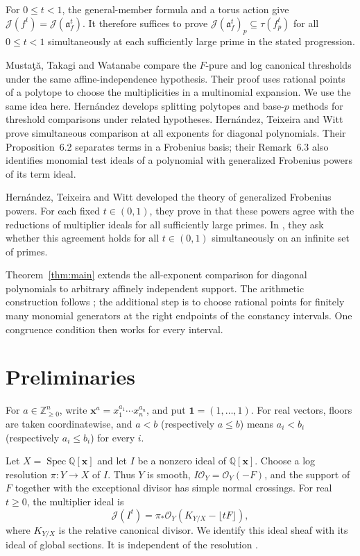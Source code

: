 \documentclass[11pt]{amsart}
\numberwithin{equation}{section}
\theoremstyle{definition}
\newcommand{\J}{\mathcal J}
\newcommand{\OO}{\mathcal O}
\newcommand{\aideal}{\mathfrak a}
\newcommand{\Q}{\mathbb Q}
\newcommand{\Z}{\mathbb Z}
\newcommand{\xx}{\boldsymbol{x}}
\newcommand{\one}{\boldsymbol{1}}
\begin{document}
For $0\le t<1$, the general-member formula and a torus action give
$\J(f^t)=\J(\aideal_f^t)$. It therefore suffices to prove
$\J(\aideal_f^t)_p\subseteq\tau(f_p^t)$ for all $0\le t<1$ simultaneously
at each sufficiently large prime in the stated progression.

Musta\c{t}\u{a}, Takagi and Watanabe \cite[Example~4.2]{MTW} compare the
$F$-pure and log canonical thresholds under the same affine-independence
hypothesis. Their proof uses rational points of a polytope to choose the multiplicities
in a multinomial expansion. We use the same idea here.
Hern\'andez \cite{Her} develops splitting polytopes and base-$p$ methods
for threshold comparisons under related hypotheses.
Hern\'andez, Teixeira and Witt \cite[Theorem~6.4]{HTW} prove simultaneous
comparison at all exponents for diagonal polynomials. Their
Proposition~6.2 separates terms in a Frobenius basis; their Remark~6.3
also identifies monomial test ideals of a polynomial with generalized
Frobenius powers of its term ideal.

Hern\'andez, Teixeira and Witt developed the theory of generalized
Frobenius powers. For each fixed $t\in(0,1)$, they prove in
\cite[Theorem~6.3]{HTWF} that these powers agree with the reductions
of multiplier ideals for all sufficiently large primes. In
\cite[Question~6.6]{HTWF}, they ask whether this agreement holds for
all $t\in(0,1)$ simultaneously on an infinite set of primes.

Theorem~\ref{thm:main} extends the all-exponent comparison for diagonal
polynomials to arbitrary affinely independent support. The arithmetic
construction follows \cite[Example~4.2]{MTW}; the additional step is to
choose rational points for finitely many monomial generators at the right
endpoints of the constancy intervals. One congruence condition then works
for every interval.
\section{Preliminaries}
For $a\in\Z_{\ge 0}^n$, write $\xx^a=x_1^{a_1}\cdots x_n^{a_n}$, and put
$\one=(1,\ldots,1)$. For real vectors, floors are taken coordinatewise,
and $a<b$ (respectively $a\le b$) means $a_i<b_i$ (respectively
$a_i\le b_i$) for every $i$.

Let $X=\operatorname{Spec}\Q[\xx]$ and let $I$ be a nonzero ideal of $\Q[\xx]$.
Choose a log resolution $\pi:Y\to X$ of $I$. Thus $Y$ is smooth,
$I\OO_Y=\OO_Y(-F)$, and the support of $F$ together with the exceptional
divisor has simple normal crossings. For real $t\ge0$, the multiplier
ideal is
\[
 \J(I^t)=\pi_*\OO_Y(K_{Y/X}-\lfloor tF\rfloor),
\]
where $K_{Y/X}$ is the relative canonical divisor. We identify this
ideal sheaf with its ideal of global sections. It is independent of the
resolution \cite[Section~3.1]{MS}.
\end{document}
